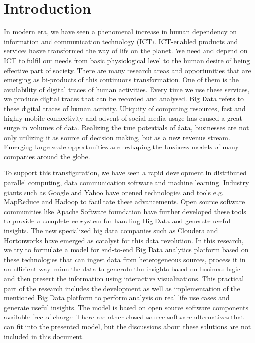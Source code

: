 \setcounter{page}{1}
\chapter{Introduction}
\label{chapter:intro}

 In modern era, we have seen a phenomenal increase in human dependency on information and communication technology (ICT). ICT-enabled products and services hasve transformed the way of life on the planet. We need and depend on ICT to fulfil our needs from basic physiological level to the human desire of being effective part of society. There are many research areas and opportunities that are emerging as bi-products of this continuous transformation. One of them is the availability of digital traces of human activities. Every time we use these services, we produce digital traces that can be recorded and analysed. Big Data refers to these digital traces of human activity. Ubiquity of computing resources, fast and highly mobile connectivity and advent of social media usage has caused a great surge in volumes of data. Realizing the true potentials of data, businesses are not only utilizing it as source of decision making, but as a new revenue stream. Emerging large scale opportunities are reshaping the business models of many companies around the globe.
 
To support this transfiguration, we have seen a rapid development in distributed parallel computing, data communication software and machine learning. Industry giants such as Google and Yahoo have opened technologies and tools e.g. MapReduce and Hadoop to facilitate these advancements. Open source software communities like Apache Software foundation have further developed these tools to provide a complete ecosystem for handling Big Data and generate useful insights. The new specialized big data companies such as Cloudera and Hortonworks have emerged as catalyst for this data revolution. In this research, we try to formulate a model for end-to-end Big Data analytics platform based on these technologies that can ingest data from heterogeneous sources, process it in an efficient way, mine the data to generate the insights based on business logic and then present the information using interactive visualizations. This practical part of the research includes the development as well as implementation of the mentioned Big Data platform to perform analysis on real life use cases and generate useful insights. The model is based on open source software components available free of charge. There are other closed source software alternatives that can fit into the presented model, but the discussions about these solutions are not included in this document.

